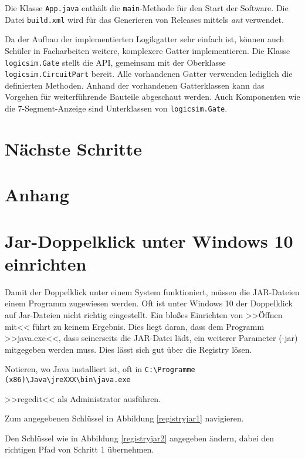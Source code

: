 \documentclass[12pt]{scrartcl}
\begin{document}
Die Klasse \texttt{App.java} enthält die \texttt{main}-Methode für den Start der Software.
Die Datei \texttt{build.xml} wird für das Generieren von Releases mittels \textit{ant} verwendet.

Da der Aufbau der implementierten Logikgatter sehr einfach ist, können auch Schüler in Facharbeiten weitere, komplexere Gatter implementieren. Die Klasse \texttt{logicsim.Gate} stellt die API, gemeinsam mit der Oberklasse \texttt{logicsim.CircuitPart} bereit. Alle vorhandenen Gatter verwenden lediglich die definierten Methoden. Anhand der vorhandenen Gatterklassen kann das Vorgehen für weiterführende Bauteile abgeschaut werden. Auch Komponenten wie die 7-Segment-Anzeige sind Unterklassen von \texttt{logicsim.Gate}.\\

\section{Nächste Schritte}

\section*{Anhang}
\appendix
\section{Jar-Doppelklick unter Windows 10 einrichten}
Damit der Doppelklick unter einem System funktioniert, müssen die JAR-Dateien einem Programm zugewiesen werden. Oft ist unter Windows 10 der Doppelklick auf Jar-Dateien nicht richtig eingestellt. Ein bloßes Einrichten von >>Öffnen mit<< führt zu keinem Ergebnis. Dies liegt daran, dass dem Programm >>java.exe<<, dass seinerseits die JAR-Datei lädt, ein weiterer Parameter (-jar) mitgegeben werden muss. Dies lässt sich gut über die Registry lösen.

\begin{compactenum}
\item Notieren, wo Java installiert ist, oft in \verb+C:\Programme (x86)\Java\jreXXX\bin\java.exe+
\item >>regedit<< als Administrator ausführen.
\item Zum angegebenen Schlüssel in Abbildung \ref{registryjar1} navigieren.
\item Den Schlüssel wie in Abbildung \ref{registryjar2} angegeben ändern, dabei den richtigen Pfad von Schritt 1 übernehmen.
\end{compactenum}

\end{document}
